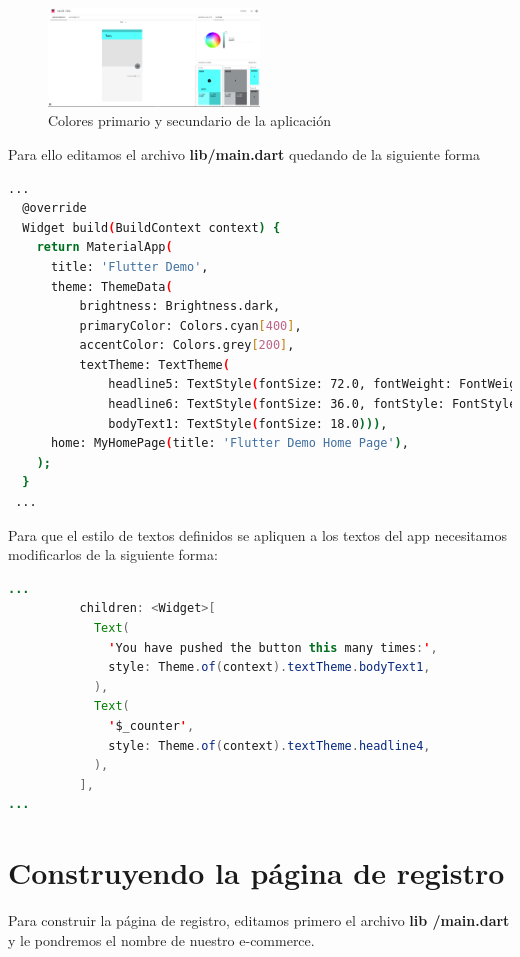 \begin{figure}[htb]
\centering
\includegraphics[width=0.5\textwidth]{capitulo1/paleta_primaria.png}
\caption{Colores primario y secundario de la aplicación}
\label{cap1:004}
\end{figure} 

Para ello editamos el archivo \textbf{lib/main.dart} quedando de la siguiente forma

\begin{lstlisting}[language=bash]
...
  @override
  Widget build(BuildContext context) {
    return MaterialApp(
      title: 'Flutter Demo',
      theme: ThemeData(
          brightness: Brightness.dark,
          primaryColor: Colors.cyan[400],
          accentColor: Colors.grey[200],
          textTheme: TextTheme(
              headline5: TextStyle(fontSize: 72.0, fontWeight: FontWeight.bold),
              headline6: TextStyle(fontSize: 36.0, fontStyle: FontStyle.italic),
              bodyText1: TextStyle(fontSize: 18.0))),
      home: MyHomePage(title: 'Flutter Demo Home Page'),
    );
  }
 ...
\end{lstlisting}

Para que el estilo de textos definidos se apliquen a los textos del app necesitamos modificarlos de la siguiente forma:

\begin{lstlisting}[language=java]
...
          children: <Widget>[
            Text(
              'You have pushed the button this many times:',
              style: Theme.of(context).textTheme.bodyText1,
            ),
            Text(
              '$_counter',
              style: Theme.of(context).textTheme.headline4,
            ),
          ],
...
\end{lstlisting}

\section{Construyendo la página de registro}
 
Para construir la página de registro, editamos primero el archivo \textbf{lib /main.dart} y le pondremos el nombre de nuestro e-commerce.

